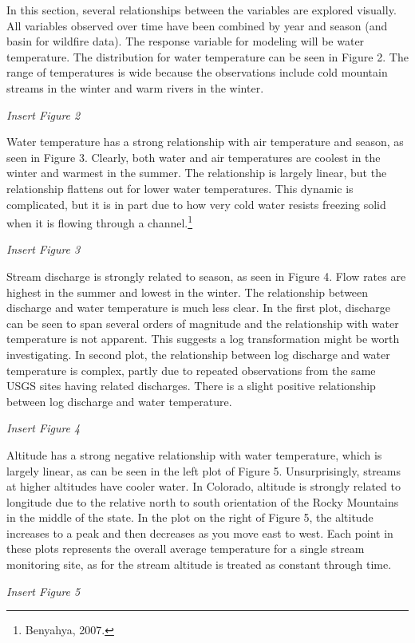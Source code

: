 \documentclass[
]{article}
\begin{document}
In this section, several relationships between the variables are
explored visually. All variables observed over time have been combined
by year and season (and basin for wildfire data). The response variable
for modeling will be water temperature. The distribution for water
temperature can be seen in Figure 2. The range of temperatures is wide
because the observations include cold mountain streams in the winter and
warm rivers in the winter.

\emph{Insert Figure 2}

Water temperature has a strong relationship with air temperature and
season, as seen in Figure 3. Clearly, both water and air temperatures
are coolest in the winter and warmest in the summer. The relationship is
largely linear, but the relationship flattens out for lower water
temperatures. This dynamic is complicated, but it is in part due to how
very cold water resists freezing solid when it is flowing through a
channel.\footnote{Benyahya, 2007.}

\emph{Insert Figure 3}

Stream discharge is strongly related to season, as seen in Figure 4.
Flow rates are highest in the summer and lowest in the winter. The
relationship between discharge and water temperature is much less clear.
In the first plot, discharge can be seen to span several orders of
magnitude and the relationship with water temperature is not apparent.
This suggests a log transformation might be worth investigating. In
second plot, the relationship between log discharge and water
temperature is complex, partly due to repeated observations from the
same USGS sites having related discharges. There is a slight positive
relationship between log discharge and water temperature.

\emph{Insert Figure 4}

Altitude has a strong negative relationship with water temperature,
which is largely linear, as can be seen in the left plot of Figure 5.
Unsurprisingly, streams at higher altitudes have cooler water. In
Colorado, altitude is strongly related to longitude due to the relative
north to south orientation of the Rocky Mountains in the middle of the
state. In the plot on the right of Figure 5, the altitude increases to a
peak and then decreases as you move east to west. Each point in these
plots represents the overall average temperature for a single stream
monitoring site, as for the stream altitude is treated as constant
through time.

\emph{Insert Figure 5}
\end{document}
